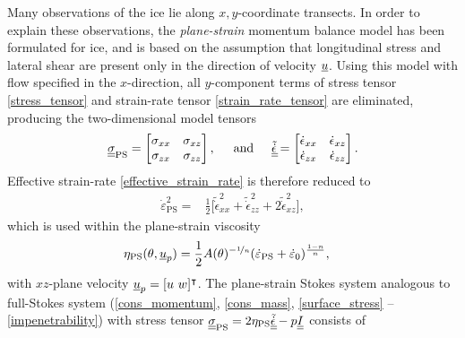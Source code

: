 Many observations of the ice lie along $x,y$-coordinate transects.
In order to explain these observations, the \emph{plane-strain} momentum balance model \citep{hill_1950} has been formulated for ice, and is based on the assumption that longitudinal stress and lateral shear are present only in the direction of velocity $\underline{u}$.
Using this model with flow specified in the $x$-direction, all $y$-component terms of stress tensor \cref{stress_tensor} and strain-rate tensor \cref{strain_rate_tensor} are eliminated, producing the two-dimensional model tensors  
\begin{align}
  \label{ps_tensors}
  \underline{\underline{\sigma}}_{\text{PS}} = \begin{bmatrix}
             \sigma_{xx} & \sigma_{xz} \\
             \sigma_{zx} & \sigma_{zz}
           \end{bmatrix}, \hspace{5mm} \text{and} \hspace{5mm}
  \tilde{\underline{\underline{\dot{\epsilon}}}} = \begin{bmatrix}
                             \dot{\epsilon}_{xx} & \dot{\epsilon}_{xz} \\
                             \dot{\epsilon}_{zx} & \dot{\epsilon}_{zz}
                           \end{bmatrix}.
\end{align}
Effective strain-rate \cref{effective_strain_rate} is therefore reduced to
\begin{align}
  \label{ps_effective_strain_rate}
  \dot{\varepsilon}_{\text{PS}}^2 = &\frac{1}{2} \Bigg[ \tilde{\dot{\epsilon}}_{xx}^2 + \tilde{\dot{\epsilon}}_{zz}^2 + 2\tilde{\dot{\epsilon}}_{xz}^2 \Bigg],
\end{align}
which is used within the plane-strain viscosity
\begin{align}
  \label{ps_viscosity}
  \eta_{\text{PS}}(\theta, \underline{u}_p) &= \frac{1}{2}A(\theta)^{-\nicefrac{1}{n}} (\dot{\varepsilon}_{\text{PS}} + \dot{\varepsilon}_0)^{\frac{1-n}{n}},
\end{align} 
with $xz$-plane velocity $\underline{u}_p = [u\ w]^\intercal$.  The plane-strain Stokes system analogous to full-Stokes system (\cref{cons_momentum}, \cref{cons_mass}, \cref{surface_stress} -- \cref{impenetrability}) with stress tensor $\underline{\underline{\sigma}}_{\text{PS}} = 2\eta_{\text{PS}} \tilde{\underline{\underline{\dot{\epsilon}}}} - p \underline{\underline{I}}$ consists of
